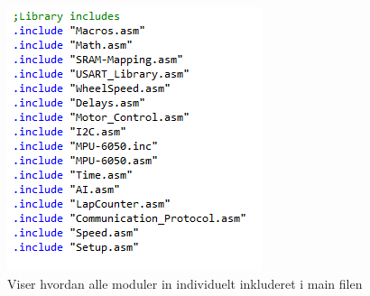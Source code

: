 \begin{figure}[h]
	\centering
  	\begin{minipage}{.5\textwidth}
  		\centering
  		\begin{minipage}{.85\textwidth}
  			\centering	
			\includegraphics[scale=0.2,width=\linewidth]{Billeder/main_example.PNG}
			\caption{Viser hvordan alle moduler in individuelt inkluderet i main filen}
			\label{fig:MainExample}
		\end{minipage}
	\end{minipage}%
	\begin{minipage}{.5\textwidth}
			\centering
			\begin{minipage}{.85\textwidth}

\end{minipage}
\end{minipage}
\end{figure}
